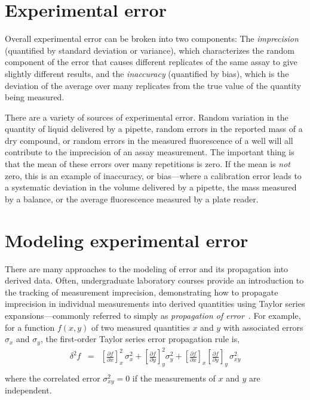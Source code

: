 \documentclass[aps,pre,twocolumn,nofootinbib,superscriptaddress,linenumbers]{revtex4-1}
\begin{document}
\section{Experimental error}

Overall experimental error can be broken into two components: The \emph{imprecision} (quantified by standard deviation or variance), which characterizes the random component of the error that causes different replicates of the same assay to give slightly different results, and the \emph{inaccuracy} (quantified by bias), which is the deviation of the average over many replicates from the true value of the quantity being measured.

There are a variety of sources of experimental error. 
Random variation in the quantity of liquid delivered by a pipette, random errors in the reported mass of a dry compound, or random errors in the measured fluorescence of a well will all contribute to the imprecision of an assay measurement.
The important thing is that the mean of these errors over many repetitions is zero. 
If the mean is \emph{not} zero, this is an example of inaccuracy, or bias---where a calibration error leads to a systematic deviation in the volume delivered by a pipette, the mass measured by a balance, or the average fluorescence measured by a plate reader.

\section*{Modeling experimental error}

There are many approaches to the modeling of error and its propagation into derived data.
Often, undergraduate laboratory courses provide an introduction to the tracking of measurement imprecision, demonstrating how to propagate imprecision in individual measurements into derived quantities using Taylor series expansions---commonly referred to simply as \emph{propagation of error}~\cite{taylor_introduction_1997}.
For example, for a function $f(x,y)$ of two measured quantities $x$ and $y$ with associated errors $\sigma_x$ and $\sigma_y$, the first-order Taylor series error propagation rule is,
\begin{eqnarray}
\delta^2 f &=& \left[\frac{\partial f}{\partial x}\right]^2_x \, \sigma^2_x + \left[\frac{\partial f}{\partial y}\right]^2_y \sigma^2_y + \left[\frac{\partial f}{\partial x}\right]_x \left[\frac{\partial f}{\partial y}\right]_y \, \sigma^2_{xy} \nonumber \\ \label{equation:error-propagation}
\end{eqnarray}
where the correlated error $\sigma^2_{xy} = 0$ if the measurements of $x$ and $y$ are independent.
\end{document}
